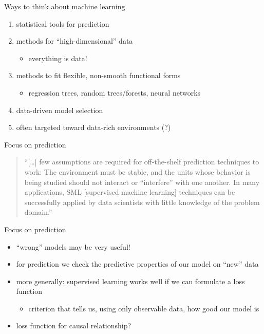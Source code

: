 \documentclass[xcolor=dvipsnames]{beamer}
\begin{document}
\begin{frame}{Ways to think about machine learning}
\begin{enumerate}
  \item
  statistical tools for prediction
  \item 
  methods for ``high-dimensional'' data
  \begin{itemize}
    \item everything is data!
  \end{itemize}
  \item 
  methods to fit flexible, non-smooth functional forms 
  \begin{itemize}
    \item regression trees, random trees/forests, neural networks
  \end{itemize}
  \item 
  data-driven model selection
  \item 
  often targeted toward data-rich environments (?)
\end{enumerate}
\end{frame}


\begin{frame}{Focus on prediction}
\begin{quote}
``[\dots] few assumptions are required for off-the-shelf prediction techniques to work: The environment must be stable, and the units whose behavior is being studied should not interact or ``interfere'' with one another. In many applications, SML [supervised machine learning] techniques can be successfully applied by data scientists with little knowledge of the problem domain.'' \parencite{athey2017beyond}
\end{quote}
\end{frame}

\begin{frame}{Focus on prediction}
\begin{itemize}
  \item ``wrong'' models may be very useful!
  \item for prediction we check the predictive properties of our model on ``new'' data
  \item more generally: supervised learning works well if we can formulate a loss function
  \begin{itemize}
    \item criterion that tells us, using only observable data, how good our model is
  \end{itemize}
  \item loss function for causal relationship?
\end{itemize}
\end{frame}
\end{document}
